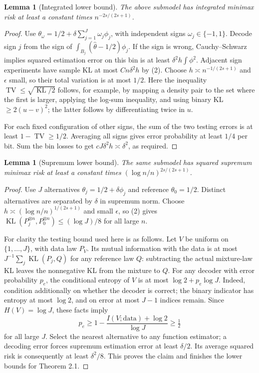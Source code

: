 \documentclass[11pt,a4paper]{article}
\newtheorem{lemma}[theorem]{Lemma}
\theoremstyle{remark}
\DeclareMathOperator{\KL}{KL}
\DeclareMathOperator{\TV}{TV}
\begin{document}
\begin{lemma}[Integrated lower bound]
The above submodel has integrated minimax risk at least a constant times $n^{-2s/(2s+1)}$.
\end{lemma}
\begin{proof}
Use $\theta_\omega=1/2+\delta\sum_{j=1}^J\omega_j\phi_j$, with independent signs $\omega_j\in\{-1,1\}$. Decode sign $j$ from the sign of $\int_{B_j}(\widehat\theta-1/2)\phi_j$. If the sign is wrong, Cauchy--Schwarz implies squared estimation error on this bin is at least $\delta^2h\int\phi^2$. Adjacent sign experiments have sample KL at most $C n\delta^2h$ by (2). Choose $h\asymp n^{-1/(2s+1)}$ and $\epsilon$ small, so their total variation is at most $1/2$. Here the inequality $\TV\le\sqrt{\KL/2}$ follows, for example, by mapping a density pair to the set where the first is larger, applying the log-sum inequality, and using binary KL $\ge2(u-v)^2$; the latter follows by differentiating twice in $u$.

For each fixed configuration of other signs, the sum of the two testing errors is at least $1-\TV\ge1/2$. Averaging all signs gives error probability at least $1/4$ per bit. Sum the bin losses to get $cJ\delta^2h\asymp\delta^2$, as required.
\end{proof}

\begin{lemma}[Supremum lower bound]
The same submodel has squared supremum minimax risk at least a constant times $(\log n/n)^{2s/(2s+1)}$.
\end{lemma}
\begin{proof}
Use $J$ alternatives $\theta_j=1/2+\delta\phi_j$ and reference $\theta_0=1/2$. Distinct alternatives are separated by $\delta$ in supremum norm. Choose $h\asymp(\log n/n)^{1/(2s+1)}$ and small $\epsilon$, so (2) gives $\KL(P_j^{\otimes n},P_0^{\otimes n})\le(\log J)/8$ for all large $n$.

For clarity the testing bound used here is as follows. Let $V$ be uniform on $\{1,\ldots,J\}$, with data law $P_V$. Its mutual information with the data is at most $J^{-1}\sum_j\KL(P_j,Q)$ for any reference law $Q$: subtracting the actual mixture-law KL leaves the nonnegative KL from the mixture to $Q$. For any decoder with error probability $p_e$, the conditional entropy of $V$ is at most $\log2+p_e\log J$. Indeed, condition additionally on whether the decoder is correct; the binary indicator has entropy at most $\log2$, and on error at most $J-1$ indices remain. Since $H(V)=\log J$, these facts imply
\[
 p_e\ge1-\frac{I(V;\text{data})+\log2}{\log J}\ge\tfrac12
\]
for all large $J$. Select the nearest alternative to any function estimator; a decoding error forces supremum estimation error at least $\delta/2$. Its average squared risk is consequently at least $\delta^2/8$. This proves the claim and finishes the lower bounds for Theorem 2.1.
\end{proof}
\end{document}

